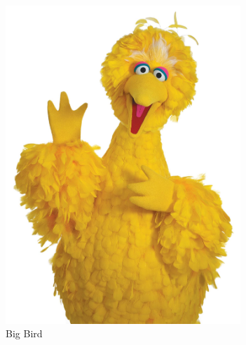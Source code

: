 \newpage

\begin{center}
\includegraphics[keepaspectratio,height=12cm]{big-bird-photo}\\
Big Bird
\end{center}

